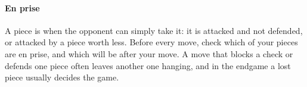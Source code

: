 
\paragraph{En prise}\label{en-prise}
A piece is  when the opponent can simply take it: it is attacked and not defended, or
attacked by a piece worth less. Before every move, check which of your pieces are en prise, and which
will be after your move. A move that blocks a check or defends one piece often leaves another one
hanging, and in the endgame a lost piece usually decides the game.
